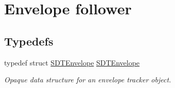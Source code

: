 \hypertarget{group__envelope}{}\section{Envelope follower}
\label{group__envelope}
\subsection*{Typedefs}
\begin{DoxyCompactItemize}
\item 
\hypertarget{group__envelope_gafbf35d3d3dc5e65f15a864c79934206d}{}typedef struct \hyperlink{group__envelope_gafbf35d3d3dc5e65f15a864c79934206d}{S\+D\+T\+Envelope} \hyperlink{group__envelope_gafbf35d3d3dc5e65f15a864c79934206d}{S\+D\+T\+Envelope}\label{group__envelope_gafbf35d3d3dc5e65f15a864c79934206d}

\begin{DoxyCompactList}\small\item\em Opaque data structure for an envelope tracker object. \end{DoxyCompactList}\end{DoxyCompactItemize}
